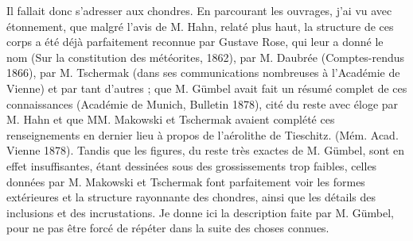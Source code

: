 \documentclass[a4paper, 12pt, oneside, french]{article}
\begin{document}
Il fallait donc s'adresser aux chondres. En parcourant les ouvrages, j'ai vu avec étonnement, que malgré l'avis de M. Hahn, relaté plus haut, la structure de ces corps a été déjà parfaitement reconnue par Gustave Rose, qui leur a donné le nom (Sur la constitution des météorites, 1862), par M. Daubrée (Comptes-rendus 1866), par M. Tschermak (dans ses communications nombreuses à l'Académie de Vienne) et par tant d'autres ; que M. Gümbel avait fait un résumé complet de ces connaissances (Académie de Munich, Bulletin 1878), cité du reste avec éloge par M. Hahn et que MM. Makowski et Tschermak avaient complété ces renseignements en dernier lieu à propos de l'aérolithe de Tieschitz. (Mém. Acad. Vienne 1878). Tandis que les figures, du reste très exactes de M. Gümbel, sont en effet insuffisantes, étant dessinées sous des grossissements trop faibles, celles données par M. Makowski et Tschermak font parfaitement voir les formes extérieures et la structure rayonnante des chondres, ainsi que les détails des inclusions et des incrustations. Je donne ici la description faite par M. Gümbel, pour ne pas être forcé de répéter dans la suite des choses connues.
\end{document}
